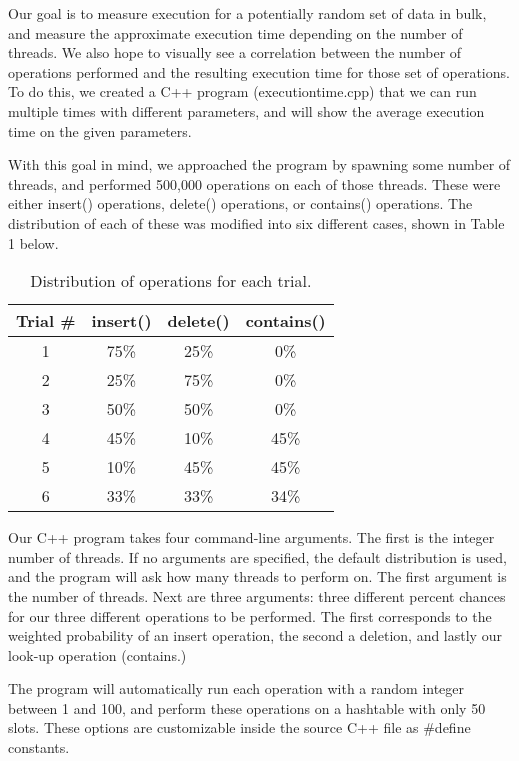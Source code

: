 \documentclass[journal]{IEEEtran}
\begin{document}
Our goal is to measure execution for a potentially random set of data in bulk, and measure the approximate execution time depending on the number of threads. We also hope to visually see a correlation between the number of operations performed and the resulting execution time for those set of operations. To do this, we created a C++ program (executiontime.cpp) that we can run multiple times with different parameters, and will show the average execution time on the given parameters.

With this goal in mind, we approached the program by spawning some number of threads, and performed 500,000 operations on each of those threads. These were either insert() operations, delete() operations, or contains() operations. The distribution of each of these was modified into six different cases, shown in Table 1 below.

%


\begin{table}[h]
\centering
\begin{center}
\begin{tabular}{ |c|c|c|c| } 
 \hline
 Trial \# & insert() & delete() & contains() \\ 
 \hline
 1 & 75\% & 25\% & 0\% \\ 
 2 & 25\% & 75\% & 0\% \\ 
 3 & 50\% & 50\% & 0\% \\ 
 4 & 45\% & 10\% & 45\% \\ 
 5 & 10\% & 45\% & 45\% \\ 
 6 & 33\% & 33\% & 34\% \\ 
 \hline
\end{tabular}
\end{center}
\caption{Distribution of operations for each trial.}
\end{table}


Our C++ program takes four command-line arguments. The first is the integer number of threads. If no arguments are specified, the default distribution is used, and the program will ask how many threads to perform on. The first argument is the number of threads. Next are three arguments: three different percent chances for our three different operations to be performed. The first corresponds to the weighted probability of an insert operation, the second a deletion, and lastly our look-up operation (contains.)

The program will automatically run each operation with a random integer between 1 and 100, and perform these operations on a hashtable with only 50 slots. These options are customizable inside the source C++ file as \#define constants.
\end{document}
